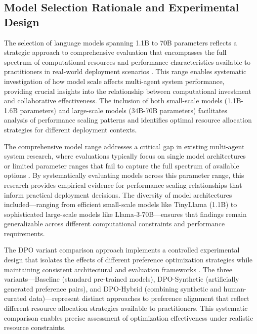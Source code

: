 \subsection{Model Selection Rationale and Experimental Design}

The selection of language models spanning 1.1B to 70B parameters reflects a strategic approach to comprehensive evaluation that encompasses the full spectrum of computational resources and performance characteristics available to practitioners in real-world deployment scenarios \cite{zhang2023balancing_skills, herel2023language_modeling}. This range enables systematic investigation of how model scale affects multi-agent system performance, providing crucial insights into the relationship between computational investment and collaborative effectiveness. The inclusion of both small-scale models (1.1B-1.6B parameters) and large-scale models (34B-70B parameters) facilitates analysis of performance scaling patterns and identifies optimal resource allocation strategies for different deployment contexts.

The comprehensive model range addresses a critical gap in existing multi-agent system research, where evaluations typically focus on single model architectures or limited parameter ranges that fail to capture the full spectrum of available options \cite{urlana2024llms_industrial, pimentel2024beyond_metrics}. By systematically evaluating models across this parameter range, this research provides empirical evidence for performance scaling relationships that inform practical deployment decisions. The diversity of model architectures included—ranging from efficient small-scale models like TinyLlama (1.1B) to sophisticated large-scale models like Llama-3-70B—ensures that findings remain generalizable across different computational constraints and performance requirements.

The DPO variant comparison approach implements a controlled experimental design that isolates the effects of different preference optimization strategies while maintaining consistent architectural and evaluation frameworks \cite{feng2024dpo_limitations, deng2025preference_data_selection}. The three variants—Baseline (standard pre-trained models), DPO-Synthetic (artificially generated preference pairs), and DPO-Hybrid (combining synthetic and human-curated data)—represent distinct approaches to preference alignment that reflect different resource allocation strategies available to practitioners. This systematic comparison enables precise assessment of optimization effectiveness under realistic resource constraints.

